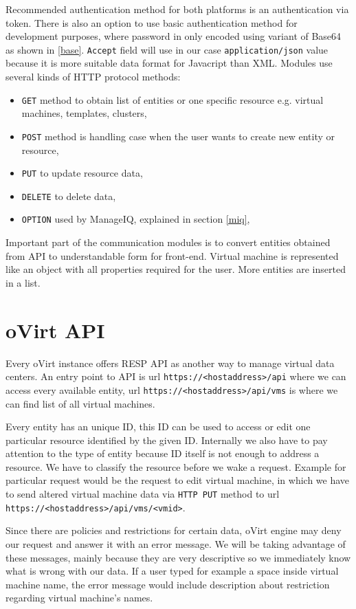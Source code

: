 Recommended authentication method for both platforms is an authentication via token. There is also an option to use basic authentication method for development purposes, where password in only encoded using variant of Base64 as shown in \ref{base}.
\texttt{Accept} field will use in our case \texttt{application/json} value because it is more suitable data format for Javacript than XML. Modules use several kinds of HTTP protocol methods: 
\begin{itemize}
\item \texttt{GET} method to obtain list of entities or one specific resource e.g. virtual machines, templates, clusters,
\item \texttt{POST} method is handling case when the user wants to create new entity or resource,
\item \texttt{PUT} to update resource data,
\item \texttt{DELETE} to delete data,
\item \texttt{OPTION} used by ManageIQ, explained in section \ref{miq},
\end{itemize}

Important part of the communication modules is to convert entities obtained from API to understandable form for front-end. Virtual machine is represented like an object with all properties required for the user. More entities are inserted in a list.

\section{oVirt API}
Every oVirt instance offers RESP API as another way to manage virtual data centers. An entry point to API is url \texttt{https://<hostaddress>/api} where we can access every available entity, url \texttt{https://<hostaddress>/api/vms} is where we can find list of all virtual machines.

Every entity has an unique ID, this ID can be used to access or edit one particular resource identified by the given ID. Internally we also have to pay attention to the type of entity because ID itself is not enough to address a resource. We have to classify the resource before we wake a request. Example for particular request would be the request to edit virtual machine, in which we have to send altered virtual machine data via \texttt{HTTP PUT} method to url \texttt{https://<hostaddress>/api/vms/<vmid>}.

Since there are policies and restrictions for certain data, oVirt engine may deny our request and answer it with an error message. We will be taking advantage of these messages, mainly because they are very descriptive so we immediately know what is wrong with our data. If a user typed for example a space inside virtual machine name, the error message would include description about restriction regarding virtual machine's names. 

